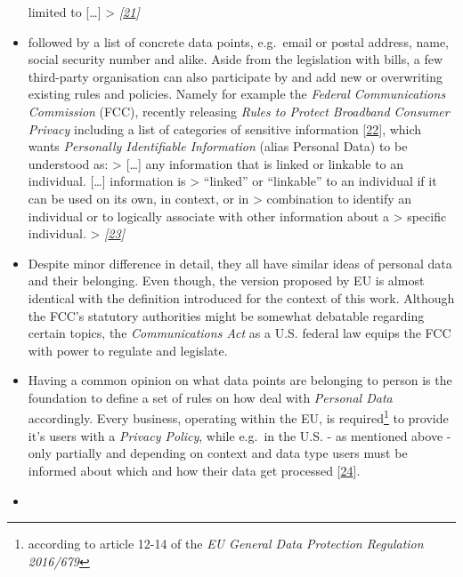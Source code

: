 \documentclass[12pt,english,a4paper,titlepage,cleardoublepage=empty,dottedtoc]{report}
\begin{document}
\begin{itemize}
  limited to {[}\ldots{}{]} \textgreater{}
  \emph{{[}\protect\hyperlink{ref-bill-draft_2015_us_consumer-privacy-bill-of-rights-act_definition}{21}{]}}
\item
  followed by a list of concrete data points, e.g.~email or postal
  address, name, social security number and alike. Aside from the
  legislation with bills, a few third-party organisation can also
  participate by and add new or overwriting existing rules and policies.
  Namely for example the \emph{Federal Communications Commission} (FCC),
  recently releasing \emph{Rules to Protect Broadband Consumer Privacy}
  including a list of categories of sensitive information
  {[}\protect\hyperlink{ref-rules_2016_fcc_to-protect-broadband-consumer-privacy_sensitive-types-of-data}{22}{]},
  which wants \emph{Personally Identifiable Information} (alias Personal
  Data) to be understood as: \textgreater{} {[}\ldots{}{]} any
  information that is linked or linkable to an individual.
  {[}\ldots{}{]} information is \textgreater{} ``linked'' or
  ``linkable'' to an individual if it can be used on its own, in
  context, or in \textgreater{} combination to identify an individual or
  to logically associate with other information about a \textgreater{}
  specific individual. \textgreater{}
  \emph{{[}\protect\hyperlink{ref-rules_2016_fcc_to-protect-broadband-consumer-privacy_personally-identifiable-information}{23}{]}}
\item
  Despite minor difference in detail, they all have similar ideas of
  personal data and their belonging. Even though, the version proposed
  by EU is almost identical with the definition introduced for the
  context of this work. Although the FCC's statutory authorities might
  be somewhat debatable regarding certain topics, the
  \emph{Communications Act} as a U.S. federal law equips the FCC with
  power to regulate and legislate.
\item
  Having a common opinion on what data points are belonging to person is
  the foundation to define a set of rules on how deal with
  \emph{Personal Data} accordingly. Every business, operating within the
  EU, is required\footnote{according to article 12-14 of the \emph{EU
    General Data Protection Regulation 2016/679}} to provide it's users
  with a \emph{Privacy Policy}, while e.g.~in the U.S. - as mentioned
  above - only partially and depending on context and data type users
  must be informed about which and how their data get processed
  {[}\protect\hyperlink{ref-web_2016_privacy-policies-are-mandatory-by-law}{24}{]}.
\item

\end{itemize}
\end{document}
